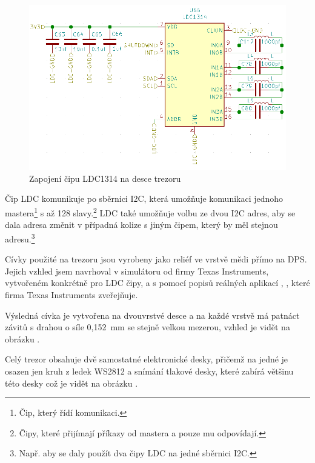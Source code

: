 \begin{figure}[h]
    \centering
    \includegraphics[width=\textwidth]{kapitoly/obrazky/E4/elektronika_tlakove_desky/moje_zapojeni.png}
    \caption{Zapojení čipu LDC1314 na desce trezoru}
    \label{fig:E4-LDC}
\end{figure}

Čip LDC komunikuje po sběrnici I2C, která umožňuje komunikaci jednoho mastera\footnote{Čip, který řídí komunikaci.} s až 128 slavy.\footnote{Čipy, které přijímají příkazy od mastera a pouze mu odpovídají.} LDC také umožňuje volbu ze dvou I2C adres, aby se dala adresa změnit v případná 
kolize s jiným čipem, který by měl stejnou adresu.\footnote{Např. aby se daly použít dva čipy LDC na jedné sběrnici I2C.}

Cívky použité na trezoru jsou vyrobeny jako reliéf ve vrstvě mědi přímo na DPS. Jejich vzhled jsem navrhoval v simulátoru od firmy Texas Instruments, 
vytvořeném konkrétně pro LDC čipy, a s pomocí popisů reálných aplikací \parencite{LDC-cd0}, \parencite{LDC-cd1}, které firma Texas Instruments zveřejňuje.


Výsledná cívka je vytvořena na dvouvrstvé desce a na každé vrstvě má patnáct závitů s drahou o síle 0,152~mm se stejně velkou mezerou, 
vzhled je vidět na obrázku .

Celý trezor obsahuje dvě samostatné elektronické desky, přičemž na jedné je osazen jen kruh z ledek WS2812 a snímání tlakové desky, které zabírá 
většinu této desky což je vidět na obrázku .